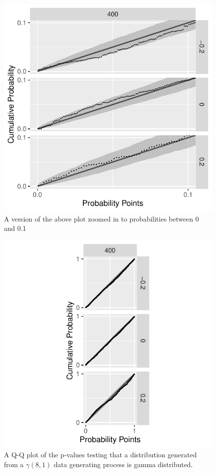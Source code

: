 \documentclass[12pt, letterpaper]{article}
\begin{document}
\begin{figure}[tbp]
  \centering
  \includegraphics[scale=1]{figures/zoom_normal}
  \caption{A version of the above plot zoomed in to probabilities between 0 and
  0.1}
  \label{fig:mu}
\end{figure}

\begin{figure}[tbp]
  \centering
  \includegraphics[scale=1]{figures/gamma}
  \caption{A Q-Q plot of the p-values testing that a distribution
  generated from a $\gamma(8,1)$ data generating process is gamma distributed.}
  \label{fig:mu}
\end{figure}
\end{document}
